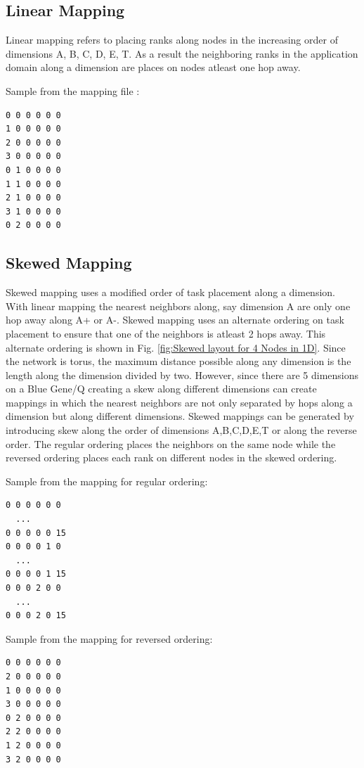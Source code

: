 \documentclass{acm_proc_article-sp}
\begin{document}
\subsection{Linear Mapping}
Linear mapping refers to placing ranks along nodes in the increasing order of dimensions A, B, C, D, E, T.
As a result the neighboring ranks in the application domain along a dimension are places on nodes atleast
one hop away.

Sample from the mapping file :
\begin{lstlisting}
0 0 0 0 0 0
1 0 0 0 0 0
2 0 0 0 0 0
3 0 0 0 0 0
0 1 0 0 0 0
1 1 0 0 0 0
2 1 0 0 0 0
3 1 0 0 0 0
0 2 0 0 0 0
\end{lstlisting}

\subsection{Skewed Mapping}

Skewed mapping uses a modified order of task placement along a dimension.
With linear mapping the nearest neighbors along, say dimension A are only one hop away along A+ or A-.
Skewed mapping uses an alternate ordering on task placement to ensure that one of the neighbors is atleast
2 hops away. This alternate ordering is shown in Fig. \ref{fig:Skewed layout for 4 Nodes in 1D}.
Since the network is torus, the maximum distance possible along any dimension is the length along
the dimension divided by two. However, since there are 5 dimensions on a Blue Gene/Q creating a skew along different
dimensions can create mappings in which the nearest neighbors are not only separated by hops along a dimension but
along different dimensions. Skewed mappings can be generated by introducing skew along the order of dimensions
A,B,C,D,E,T or along the reverse order. The regular ordering places the neighbors on the same node while the reversed
ordering places each rank on different nodes in the skewed ordering.

Sample from the mapping for regular ordering:
\begin{lstlisting}
0 0 0 0 0 0
  ...
0 0 0 0 0 15
0 0 0 0 1 0
  ...
0 0 0 0 1 15
0 0 0 2 0 0
  ...
0 0 0 2 0 15
\end{lstlisting}

Sample from the mapping for reversed ordering:
\begin{lstlisting}
0 0 0 0 0 0
2 0 0 0 0 0
1 0 0 0 0 0
3 0 0 0 0 0
0 2 0 0 0 0
2 2 0 0 0 0
1 2 0 0 0 0
3 2 0 0 0 0
\end{lstlisting}
\end{document}
